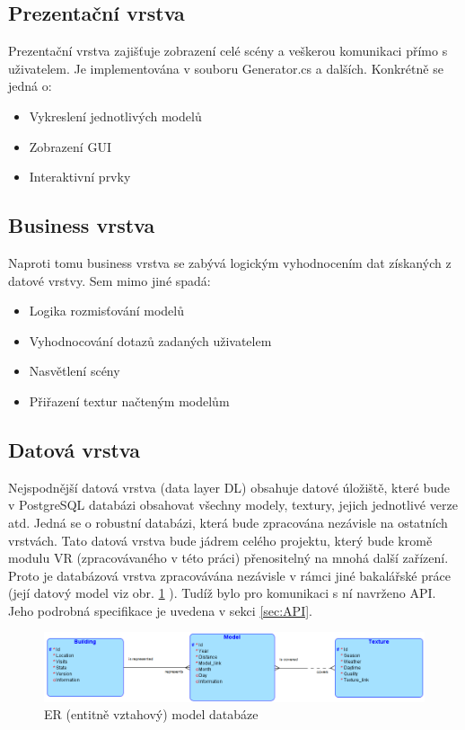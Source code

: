 \documentclass[thesis=B,czech]{FITthesis}[2012/06/26]
\begin{document}
	\subsection{Prezentační vrstva}
	Prezentační vrstva zajišťuje zobrazení celé scény a veškerou komunikaci přímo s uživatelem. Je implementována v souboru Generator.cs a dalších. Konkrétně se jedná o:
		\begin{itemize}
			\item Vykreslení jednotlivých modelů
			\item Zobrazení GUI
			\item Interaktivní prvky
		\end{itemize}

	\subsection{Business vrstva}	
	 Naproti tomu business vrstva se zabývá logickým vyhodnocením dat získaných z datové vrstvy. Sem mimo jiné spadá:
	 \begin{itemize}
			\item Logika rozmisťování modelů
			\item Vyhodnocování dotazů zadaných uživatelem
			\item Nasvětlení scény
			\item Přiřazení textur načteným modelům			
		\end{itemize}
	 
	 \subsection{Datová vrstva}
Nejspodnější datová vrstva (data layer DL) obsahuje datové úložiště, které bude v PostgreSQL databázi obsahovat všechny modely, textury, jejich jednotlivé verze atd. Jedná se o robustní databázi, která bude zpracována nezávisle na ostatních vrstvách. Tato datová vrstva bude jádrem celého projektu, který bude kromě modulu VR (zpracovávaného v této práci) přenositelný na mnohá další zařízení. Proto je databázová vrstva zpracovávána nezávisle v rámci jiné bakalářské práce (její datový model viz obr. \ref{fig:ERmodel} ). Tudíž bylo pro komunikaci s ní navrženo API. Jeho podrobná specifikace je uvedena v sekci \ref{sec:API}.
	
	\begin{figure}
  		\includegraphics[width=\textwidth,height=\textheight,keepaspectratio]{ERmodel.png}
  		\caption{ER (entitně vztahový) model databáze}
  		\label{fig:ERmodel}
	\end{figure}
	
\end{document}
